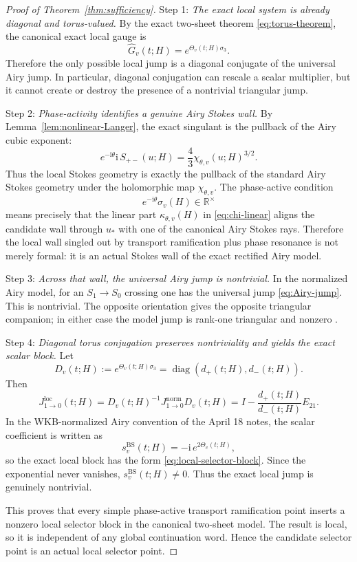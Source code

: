\documentclass[11pt]{article}
\numberwithin{equation}{section}
\theoremstyle{definition}
\newcommand{\ii}{\mathrm i}
\newcommand{\diag}{\operatorname{diag}}
\newcommand{\sigmaPauli}{\sigma_3}
\begin{document}
\begin{proof}[Proof of Theorem~\ref{thm:sufficiency}]
Step 1: \emph{The exact local system is already diagonal and torus-valued.} By the exact two-sheet theorem \eqref{eq:torus-theorem}, the canonical exact local gauge is
\[
\widehat G_v(t;H)=e^{\Theta_v(t;H)\sigmaPauli}.
\]
Therefore the only possible local jump is a diagonal conjugate of the universal Airy jump. In particular, diagonal conjugation can rescale a scalar multiplier, but it cannot create or destroy the presence of a nontrivial triangular jump.

Step 2: \emph{Phase-activity identifies a genuine Airy Stokes wall.} By Lemma~\ref{lem:nonlinear-Langer}, the exact singulant is the pullback of the Airy cubic exponent:
\[
e^{-\ii\theta}\ii\,S_{+-}(u;H)=\frac{4}{3}\chi_{\theta,v}(u;H)^{3/2}.
\]
Thus the local Stokes geometry is exactly the pullback of the standard Airy Stokes geometry under the holomorphic map $\chi_{\theta,v}$. The phase-active condition
\begin{equation}
\label{eq:phase-active}
 e^{-\ii\theta}\sigma_v(H)\in \mathbb R^\times
\end{equation}
means precisely that the linear part $\kappa_{\theta,v}(H)$ in \eqref{eq:chi-linear} aligns the candidate wall through $u_*$ with one of the canonical Airy Stokes rays. Therefore the local wall singled out by transport ramification plus phase resonance is not merely formal: it is an actual Stokes wall of the exact rectified Airy model.

Step 3: \emph{Across that wall, the universal Airy jump is nontrivial.} In the normalized Airy model, for an $S_1\to S_0$ crossing one has the universal jump \eqref{eq:Airy-jump}. This is nontrivial. The opposite orientation gives the opposite triangular companion; in either case the model jump is rank-one triangular and nonzero \cite{LocalMatching}.

Step 4: \emph{Diagonal torus conjugation preserves nontriviality and yields the exact scalar block.} Let
\[
D_v(t;H):=e^{\Theta_v(t;H)\sigmaPauli}=\diag(d_+(t;H),d_-(t;H)).
\]
Then
\begin{equation}
\label{eq:conjugated-jump}
J^{\mathrm{loc}}_{1\to 0}(t;H)=D_v(t;H)^{-1}J^{\mathrm{norm}}_{1\to 0}D_v(t;H)
=I-\frac{d_+(t;H)}{d_-(t;H)}E_{21}.
\end{equation}
In the WKB-normalized Airy convention of the April 18 notes, the scalar coefficient is written as
\[
s_v^{\mathrm{BS}}(t;H)=-\ii\,e^{2\Theta_v(t;H)},
\]
so the exact local block has the form \eqref{eq:local-selector-block}. Since the exponential never vanishes, $s_v^{\mathrm{BS}}(t;H)\neq 0$. Thus the exact local jump is genuinely nontrivial.

This proves that every simple phase-active transport ramification point inserts a nonzero local selector block in the canonical two-sheet model. The result is local, so it is independent of any global continuation word. Hence the candidate selector point is an actual local selector point.
\end{proof}
\end{document}
